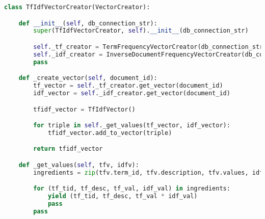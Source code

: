 \begin{lstlisting}[language=Python,caption={Python code for calculating tfidf-vectos on basis on tf- and idf-vectors},label={lst:tfidf-code},float=h]
class TfIdfVectorCreator(VectorCreator):

    def __init__(self, db_connection_str):
        super(TfIdfVectorCreator, self).__init__(db_connection_str)

        self._tf_creator = TermFrequencyVectorCreator(db_connection_str)
        self._idf_creator = InverseDocumentFrequencyVectorCreator(db_connection_str)
        pass

    def _create_vector(self, document_id):
        tf_vector = self._tf_creator.get_vector(document_id)
        idf_vector = self._idf_creator.get_vector(document_id)

        tfidf_vector = TfIdfVector()

        for triple in self._get_values(tf_vector, idf_vector):
            tfidf_vector.add_to_vector(triple)

        return tfidf_vector

    def _get_values(self, tfv, idfv):
        ingredients = zip(tfv.term_id, tfv.description, tfv.values, idfv.values)

        for (tf_tid, tf_desc, tf_val, idf_val) in ingredients:
            yield (tf_tid, tf_desc, tf_val * idf_val)
            pass
        pass
\end{lstlisting}

